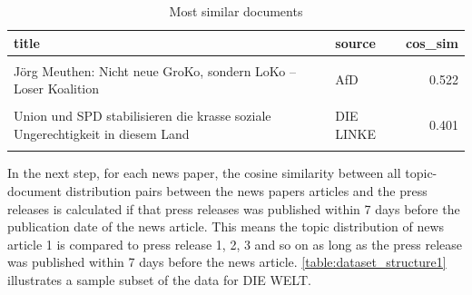 \documentclass[
]{article}
\begin{document}
\begin{table}[H]

\caption{\label{tab:Documents with highest similarity}Most similar documents \label{table:cosine_sim_sample_doc}}
\centering
\fontsize{7}{9}\selectfont
\begin{tabular}[t]{llr}
\toprule
title & source & cos\_sim\\
\midrule
\cellcolor{gray!6}{Asylzahlen 2017 - schwarz-rot führt Obergrenze durch die Hintertür ein} & \cellcolor{gray!6}{DIE LINKE} & \cellcolor{gray!6}{0.542}\\
Jörg Meuthen: Nicht neue GroKo, sondern LoKo – Loser Koalition & AfD & 0.522\\
\cellcolor{gray!6}{Rentenpläne von Union und SPD schlimmer als erwartet} & \cellcolor{gray!6}{FDP} & \cellcolor{gray!6}{0.478}\\
Union und SPD stabilisieren die krasse soziale Ungerechtigkeit in diesem Land & DIE LINKE & 0.401\\
\cellcolor{gray!6}{Jürgen Pohl: Union und SPD verabreden Politik zu Lasten von Rentnern und Ostdeutschen} & \cellcolor{gray!6}{AfD} & \cellcolor{gray!6}{0.388}\\
\bottomrule
\end{tabular}
\end{table}

In the next step, for each news paper, the cosine similarity between all
topic-document distribution pairs between the news papers articles and
the press releases is calculated if that press releases was published
within 7 days before the publication date of the news article. This
means the topic distribution of news article 1 is compared to press
release 1, 2, 3 and so on as long as the press release was published
within 7 days before the news article.
\autoref{table:dataset_structure1} illustrates a sample subset of the
data for DIE WELT.
\end{document}
